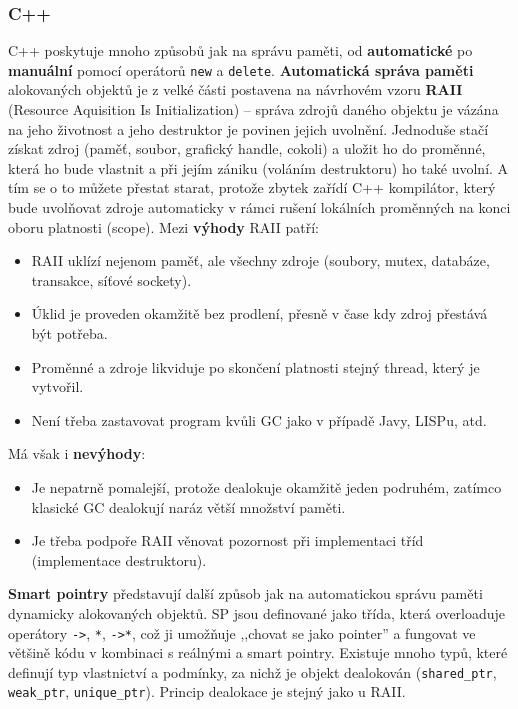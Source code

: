 \subsubsection{C++}
C++ poskytuje mnoho způsobů jak na správu paměti, od \textbf{automatické} po \textbf{manuální} pomocí operátorů \texttt{new} a \texttt{delete}. \textbf{Automatická správa paměti} alokovaných objektů je z velké části postavena na návrhovém vzoru \textbf{RAII} (Resource Aquisition Is Initialization) -- správa zdrojů daného objektu je vázána na jeho životnost a jeho destruktor je povinen jejich uvolnění. Jednoduše stačí získat zdroj (paměť, soubor, grafický handle, cokoli) a uložit ho do proměnné, která ho bude vlastnit a při jejím zániku (voláním destruktoru) ho také uvolní. A tím se o to můžete přestat starat, protože zbytek zařídí C++ kompilátor, který bude uvolňovat zdroje automaticky v rámci rušení lokálních proměnných na konci oboru platnosti (scope). Mezi \textbf{výhody} RAII patří:
\begin{itemize}
\item RAII uklízí nejenom paměť, ale všechny zdroje (soubory, mutex, databáze, transakce, síťové sockety).
\item Úklid je proveden okamžitě bez prodlení, přesně v čase kdy zdroj přestává být potřeba.
\item Proměnné a zdroje likviduje po skončení platnosti stejný thread, který je vytvořil.
\item Není třeba zastavovat program kvůli GC jako v případě Javy, LISPu, atd.
\end{itemize}
Má však i \textbf{nevýhody}:
\begin{itemize}
\item Je nepatrně pomalejší, protože dealokuje okamžitě jeden podruhém, zatímco klasické GC dealokují naráz větší množství paměti.
\item Je třeba podpoře RAII věnovat pozornost při implementaci tříd (implementace destruktoru).
\end{itemize}

\textbf{Smart pointry} představují další způsob jak na automatickou správu paměti dynamicky alokovaných objektů. SP jsou definované jako třída, která overloaduje operátory \texttt{->}, \texttt{*}, \texttt{->*}, což ji umožňuje ,,chovat se jako pointer'' a fungovat ve většině kódu v kombinaci s reálnými a smart pointry. Existuje mnoho typů, které definují typ vlastnictví a podmínky, za nichž je objekt dealokován (\texttt{shared\_ptr}, \texttt{weak\_ptr}, \texttt{unique\_ptr}). Princip dealokace je stejný jako u RAII.

